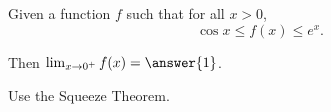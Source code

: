 \documentclass{ximera}
\author{Nela Lakos \and Kyle Parsons}
\begin{document}
	\begin{exercise}

		Given a function $f$ such that for all $x>0$, 
		\[ \cos x \leq f(x) \leq e^x. \]

		Then $\lim_{x\to0^+}f(x) = \answer{1}$.

		\begin{hint}
			Use the Squeeze Theorem.
		\end{hint}

	\end{exercise}
\end{document}
